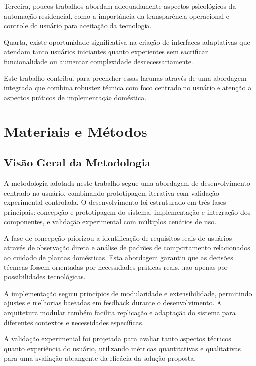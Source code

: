 \documentclass[twoside,english,brazilian]{UNISINOSmonografia}
\begin{document}
Terceira, poucos trabalhos abordam adequadamente aspectos psicológicos da automação residencial, como a importância da transparência operacional e controle do usuário para aceitação da tecnologia.

Quarta, existe oportunidade significativa na criação de interfaces adaptativas que atendam tanto usuários iniciantes quanto experientes sem sacrificar funcionalidade ou aumentar complexidade desnecessariamente.

Este trabalho contribui para preencher essas lacunas através de uma abordagem integrada que combina robustez técnica com foco centrado no usuário e atenção a aspectos práticos de implementação doméstica.

\chapter{Materiais e Métodos}

\section{Visão Geral da Metodologia}

A metodologia adotada neste trabalho segue uma abordagem de desenvolvimento centrado no usuário, combinando prototipagem iterativa com validação experimental controlada. O desenvolvimento foi estruturado em três fases principais: concepção e prototipagem do sistema, implementação e integração dos componentes, e validação experimental com múltiplos cenários de uso.

A fase de concepção priorizou a identificação de requisitos reais de usuários através de observação direta e análise de padrões de comportamento relacionados ao cuidado de plantas domésticas. Esta abordagem garantiu que as decisões técnicas fossem orientadas por necessidades práticas reais, não apenas por possibilidades tecnológicas.

A implementação seguiu princípios de modularidade e extensibilidade, permitindo ajustes e melhorias baseadas em feedback durante o desenvolvimento. A arquitetura modular também facilita replicação e adaptação do sistema para diferentes contextos e necessidades específicas.

A validação experimental foi projetada para avaliar tanto aspectos técnicos quanto experiência do usuário, utilizando métricas quantitativas e qualitativas para uma avaliação abrangente da eficácia da solução proposta.
\end{document}
